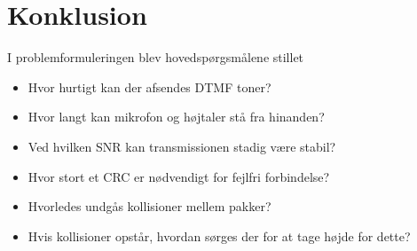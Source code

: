 \section{Konklusion}
I problemformuleringen blev hovedspørgsmålene stillet

\begin{itemize}
	\item	Hvor hurtigt kan der afsendes DTMF toner?
	\item	Hvor langt kan mikrofon og højtaler stå fra hinanden?
	\item	Ved hvilken SNR kan transmissionen stadig være stabil?
	\item	Hvor stort et CRC er nødvendigt for fejlfri forbindelse?
	\item	Hvorledes undgås kollisioner mellem pakker?
	\item	Hvis kollisioner opstår, hvordan sørges der for at tage højde for dette?
\end{itemize}


